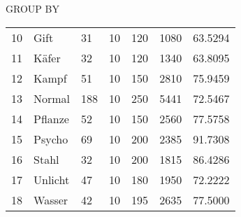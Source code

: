 \begin{example}{GROUP BY}
\begin{tabular}{I|TIIIII}
        10 & Gift                    & 31                           & 10                               & 120                              & 1080                             & 63.5294                          \\
        11 & Käfer                   & 32                           & 10                               & 120                              & 1340                             & 63.8095                          \\
        12 & Kampf                   & 51                           & 10                               & 150                              & 2810                             & 75.9459                          \\
        13 & Normal                  & 188                          & 10                               & 250                              & 5441                             & 72.5467                          \\
        14 & Pflanze                 & 52                           & 10                               & 150                              & 2560                             & 77.5758                          \\
        15 & Psycho                  & 69                           & 10                               & 200                              & 2385                             & 91.7308                          \\
        16 & Stahl                   & 32                           & 10                               & 200                              & 1815                             & 86.4286                          \\
        17 & Unlicht                 & 47                           & 10                               & 180                              & 1950                             & 72.2222                          \\
        18 & Wasser                  & 42                           & 10                               & 195                              & 2635                             & 77.5000                          \\
    \end{tabular}
\end{example}

